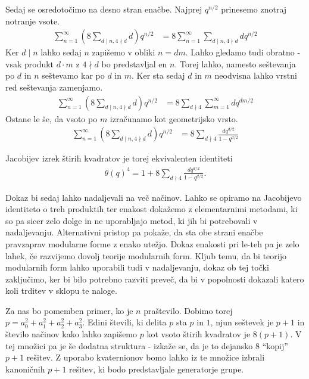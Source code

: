 \begin{dokaz}
    Sedaj se osredotočimo na desno stran enačbe. Najprej \(q^{n/2}\) prinesemo znotraj notranje vsote.
    \begin{align*}
        \sum_{n=1}^\infty \left(8\sum_{d\mid n, 4\nmid d} d \right) q^{n/2} & =  8\sum_{n=1}^\infty \sum_{d\mid n, 4\nmid d} d  q^{n/2}
    \end{align*}
    Ker \(d \mid n\) lahko sedaj \(n\) zapišemo v obliki \(n = dm\). Lahko gledamo tudi obratno - vsak produkt \(d\cdot m\) z \(4\nmid d\) bo predstavljal en \(n\). Torej lahko, namesto seštevanja po \(d\) in \(n\) seštevamo kar po \(d\) in \(m\). Ker sta sedaj \(d\) in \(m\) neodvisna lahko vrstni red seštevanja zamenjamo.
    \begin{align*}
        \sum_{n=1}^\infty \left(8\sum_{d\mid n, 4\nmid d} d \right) q^{n/2} & =  8\sum_{d\nmid 4} \sum_{m = 1}^\infty d  q^{dm/2}
    \end{align*}
    Ostane le še, da vsoto po \(m\) izračunamo kot geometrijsko vrsto.
    \begin{align*}
        \sum_{n=1}^\infty \left(8\sum_{d\mid n, 4\nmid d} d \right) q^{n/2} & = 8\sum_{d\nmid 4} \frac{d q^{d/2}}{1-q^{d/2}}
    \end{align*}

    Jacobijev izrek štirih kvadratov je torej ekvivalenten identiteti
    \begin{align*}
        \theta(q)^4 = 1+8\sum_{d\nmid 4} \frac{d q^{d/2}}{1-q^{d/2}}.
    \end{align*}

    Dokaz bi sedaj lahko nadaljevali na več načinov. Lahko se opiramo na Jacobijevo identiteto o treh produktih ter enakost dokažemo z elementarnimi metodami, ki so pa sicer zelo dolge in ne uporabljajo metod, ki jih bi potrebovali v nadaljevanju. Alternativni pristop pa pokaže, da sta obe strani enačbe pravzaprav modularne forme z enako utežjo. Dokaz enakosti pri le-teh pa je zelo lahek, če razvijemo dovolj teorije modularnih form. Kljub temu, da bi teorijo modularnih form lahko uporabili tudi v nadaljevanju, dokaz ob tej točki zaključimo, ker bi bilo potrebno razviti preveč, da bi v popolnosti dokazali katero koli trditev v sklopu te naloge.
\end{dokaz}

Za nas bo pomemben primer, ko je \(n\) praštevilo. Dobimo torej \(p=a_0^2 + a_1^2 + a_2^2 + a_3^2\). Edini števili, ki delita \(p\) sta \(p\) in \(1\), njun seštevek je \(p+1\) in število načinov kako lahko zapišemo \(p\) kot vsoto štirih kvadratov je \(8(p+1)\). V tej množici pa je še dodatna struktura - izkaže se, da je to dejansko \(8\) ``kopij'' \(p+1\) rešitev. Z uporabo kvaternionov bomo lahko iz te množice izbrali kanoničnih \(p+1\) rešitev, ki bodo predstavljale generatorje grupe.

